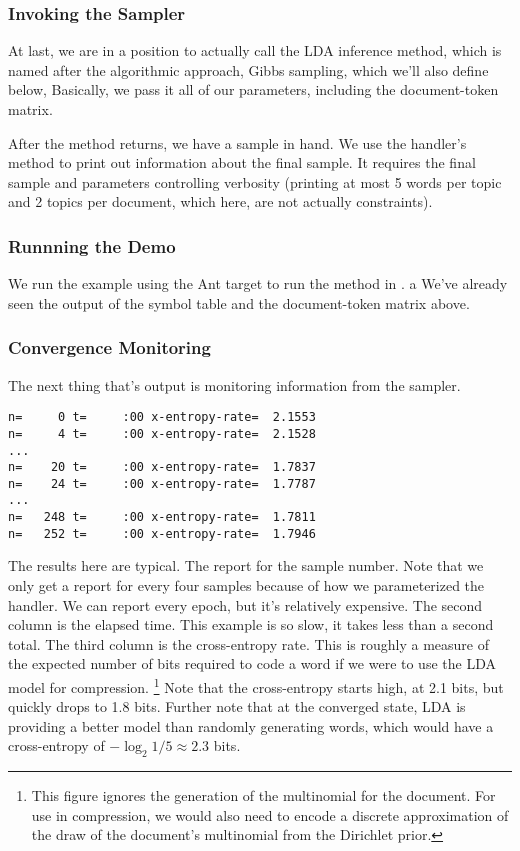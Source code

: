 \subsubsection{Invoking the Sampler}

At last, we are in a position to actually call the LDA inference
method, which is named after the algorithmic approach, Gibbs
sampling, which we'll also define below,
%
%
Basically, we pass it all of our parameters, including the
document-token matrix.

After the method returns, we have a sample in hand.  We use the
handler's  method to print out information
about the final sample.  It requires the final sample and parameters
controlling verbosity (printing at most 5 words per topic and 2 topics
per document, which here, are not actually constraints).
%

\subsubsection{Runnning the Demo}

We run the example using the Ant target  to
run the  method in .  
a
%
%
We've already seen the output of the symbol table and the 
document-token matrix above.  

\subsubsection{Convergence Monitoring}

The next thing that's output is monitoring information from the
sampler.
%
\begin{verbatim}
n=     0 t=     :00 x-entropy-rate=  2.1553
n=     4 t=     :00 x-entropy-rate=  2.1528
...
n=    20 t=     :00 x-entropy-rate=  1.7837
n=    24 t=     :00 x-entropy-rate=  1.7787
...
n=   248 t=     :00 x-entropy-rate=  1.7811
n=   252 t=     :00 x-entropy-rate=  1.7946
\end{verbatim}
%
The results here are typical.  The report for the sample number.  Note
that we only get a report for every four samples because of how we
parameterized the handler.  We can report every epoch, but it's
relatively expensive.  The second column is the elapsed time.  This
example is so slow, it takes less than a second total.  The third
column is the cross-entropy rate.  This is roughly a measure of the
expected number of bits required to code a word if we were to use
the LDA model for compression.%
%
\footnote{This figure ignores the generation of the multinomial for
  the document. For use in compression, we would also need to encode a
  discrete approximation of the draw of the document's multinomial
  from the Dirichlet prior.}
%
Note that the cross-entropy starts high, at 2.1 bits, but quickly
drops to 1.8 bits.  Further note that at the converged state, LDA is
providing a better model than randomly generating words, which would
have a cross-entropy of $- \log_2 1/5 \approx 2.3$ bits.

